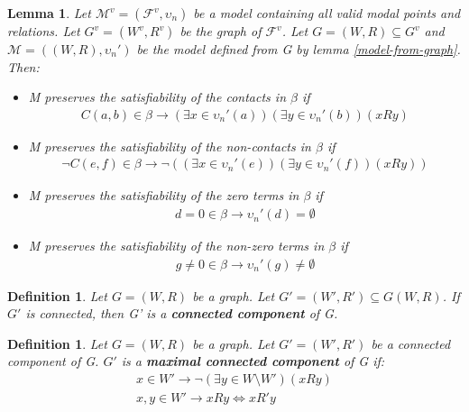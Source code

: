 \documentclass{article}
\newcommand\M{\mathcal{M}}
\newcommand\F{\mathcal{F}}
\newtheorem{lemma}[theorem]{Lemma}
\newtheorem{defn}[theorem]{Definition}
\begin{document}
	\begin{lemma}
		Let $\M^v = (\F^v, \upsilon_n)$ be a model containing all valid modal points and relations. Let $G^v=(W^v, R^v)$ be the graph of $\F^v$. Let $G=(W,R) \subseteq G^v$ and $\M=((W,R), \upsilon_n')$ be the model defined from G by lemma \ref{model-from-graph}. Then:
		\begin{itemize}
			\item M preserves the satisfiability of the contacts in $\beta$ if
			\begin{gather*}
				C(a,b) \in \beta \rightarrow (\exists x \in \upsilon_n'(a))(\exists y \in \upsilon_n'(b))(xRy)
			\end{gather*}

			\item M preserves the satisfiability of the non-contacts in $\beta$ if
			\begin{gather*}
				\neg C(e,f) \in \beta \rightarrow \neg ((\exists x \in \upsilon_n'(e))(\exists y \in \upsilon_n'(f))(xRy))
			\end{gather*}

			\item M preserves the satisfiability of the zero terms in $\beta$ if
			\begin{gather*}
				d = 0 \in \beta \rightarrow \upsilon_n'(d) = \emptyset
			\end{gather*}

			\item M preserves the satisfiability of the non-zero terms in $\beta$ if
			\begin{gather*}
				g \neq 0 \in \beta \rightarrow \upsilon_n'(g) \neq \emptyset
			\end{gather*}
		\end{itemize}
	\end{lemma}

	\begin{defn}
		Let $G=(W, R)$ be a graph. Let $G'=(W', R') \subseteq G(W, R)$. If $G'$ is connected, then G' is a \textbf{connected component} of G.
	\end{defn}

	\begin{defn}
		Let $G=(W, R)$ be a graph. Let $G'=(W', R')$ be a connected component of G. $G'$ is a \textbf{maximal connected component} of G if:
		\begin{gather*}
			x \in W' \rightarrow \neg(\exists y \in W \setminus W')(xRy) \\
			x,y \in W' \rightarrow xRy \iff xR'y
		\end{gather*}
	\end{defn}
\end{document}
